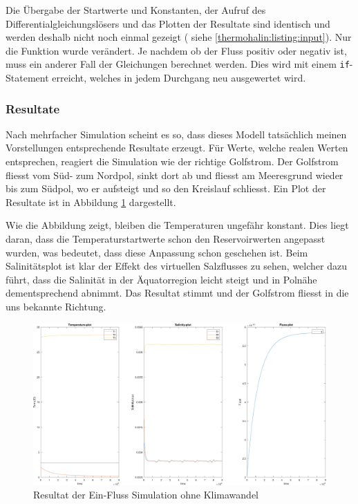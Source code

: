Die Übergabe der Startwerte und Konstanten, der Aufruf des Differentialgleichungslösers und das Plotten der Resultate sind identisch und werden deshalb nicht noch einmal gezeigt ( siehe  \ref{thermohalin:listing:input}). Nur die Funktion wurde verändert. Je nachdem ob der Fluss positiv oder negativ ist, muss ein anderer Fall der Gleichungen berechnet werden. Dies wird mit einem \texttt{if}-Statement erreicht, welches in jedem Durchgang neu ausgewertet wird. 




\subsubsection{Resultate} 

Nach mehrfacher Simulation scheint es so, dass dieses Modell tatsächlich meinen Vorstellungen entsprechende Resultate erzeugt. Für Werte, welche realen Werten entsprechen, reagiert die Simulation wie der richtige Golfstrom. Der Golfstrom fliesst vom Süd- zum Nordpol, sinkt dort ab und fliesst am Meeresgrund wieder bis zum Südpol, wo er aufsteigt und so den Kreislauf schliesst. Ein Plot der Resultate ist in Abbildung \ref{thermohalin:3b1f-skript} dargestellt.

Wie die Abbildung zeigt, bleiben die Temperaturen ungefähr konstant. Dies liegt daran, dass die Temperaturstartwerte schon den Reservoirwerten angepasst wurden, was bedeutet, dass diese Anpassung schon geschehen ist. Beim Salinitätsplot ist klar der Effekt des virtuellen Salzflusses zu sehen, welcher dazu führt, dass die Salinität in der Äquatorregion leicht steigt und in Polnähe dementsprechend abnimmt. Das Resultat stimmt und der Golfstrom fliesst in die uns bekannte Richtung.

\begin{figure}
	\centering
	\includegraphics[width=14cm]{thermohalin/Code/graphs/3b1f-skript.pdf}
	\caption{Resultat der Ein-Fluss Simulation ohne Klimawandel}
	\label{thermohalin:3b1f-skript}
\end{figure}

